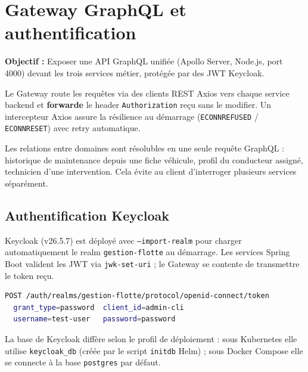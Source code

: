 \documentclass[12pt,a4paper]{article}
\begin{document}
\newpage
\section{Gateway GraphQL et authentification}

\begin{infobox}
\textbf{Objectif :} Exposer une API GraphQL unifi\'{e}e (Apollo Server, Node.js, port 4000) devant les trois services m\'{e}tier, prot\'{e}g\'{e}e par des JWT Keycloak.
\end{infobox}

Le Gateway route les requ\^{e}tes via des clients REST Axios vers chaque service backend et \textbf{forwarde} le header \texttt{Authorization} re\c{c}u sans le modifier. Un intercepteur Axios assure la r\'{e}silience au d\'{e}marrage (\texttt{ECONNREFUSED} / \texttt{ECONNRESET}) avec retry automatique.

Les relations entre domaines sont r\'{e}solubles en une seule requ\^{e}te GraphQL : historique de maintenance depuis une fiche v\'{e}hicule, profil du conducteur assign\'{e}, technicien d'une intervention. Cela \'{e}vite au client d'interroger plusieurs services s\'{e}par\'{e}ment.

\subsection{Authentification Keycloak}

Keycloak (v26.5.7) est d\'{e}ploy\'{e} avec \texttt{--import-realm} pour charger automatiquement le realm \texttt{gestion-flotte} au d\'{e}marrage. Les services Spring Boot valident les JWT via \texttt{jwk-set-uri} ; le Gateway se contente de transmettre le token re\c{c}u.

\begin{lstlisting}[language=bash, caption=R\'{e}cup\'{e}ration du token (grant type password)]
POST /auth/realms/gestion-flotte/protocol/openid-connect/token
  grant_type=password  client_id=admin-cli
  username=test-user   password=password
\end{lstlisting}

La base de Keycloak diff\`{e}re selon le profil de d\'{e}ploiement : sous Kubernetes elle utilise \texttt{keycloak\_db} (cr\'{e}\'{e}e par le script \texttt{initdb} Helm) ; sous Docker Compose elle se connecte \`{a} la base \texttt{postgres} par d\'{e}faut.
\end{document}
